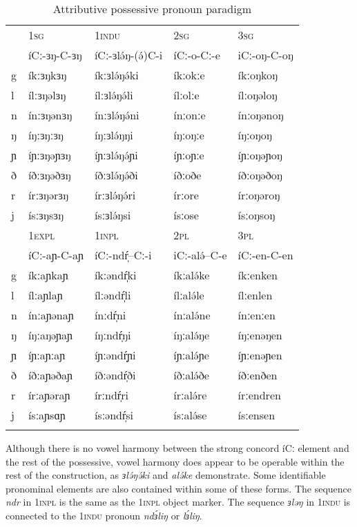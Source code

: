 \begin{table}
\begin{tabular}[t]{lllll}
\lsptoprule
	&	1\textsc{sg}			&	1\textsc{indu}		&	2\textsc{sg}			&	3\textsc{sg} \\
	& 	íCː-ɜŋ-C-ɜŋ	&	íCː-ɜlə́ŋ-(ə́)C-i & íCː-o-Cː-e 	&	iCː-oŋ-C-oŋ  \\
\midrule
	g&	íkːɜŋkɜŋ 	&	íkːɜlə́ŋə́ki	&	íkːokːe	&	íkːoŋkoŋ\\
	l&	ílːɜŋəlɜŋ 	&	ílːɜlə́ŋə́li	&	ílːolːe	&	ílːoŋəloŋ\\
	n&	ínːɜŋənɜŋ 	&	ínːɜlə́ŋə́ni	&	ínːonːe	&	ínːoŋənoŋ\\
	ŋ&	íŋːɜŋːɜŋ 	&	íŋːɜlə́ŋŋi	&	íŋːoŋːe	&	íŋːoŋoŋ	\\
	ɲ&	íɲːɜŋəɲɜŋ	&	íɲːɜlə́ŋə́ɲi  	&	íɲːoɲːe	&	íɲːoŋəɲoŋ	\\
	ð&	íðːɜŋəðɜŋ 	&	íðːɜlə́ŋə́ði 	&	íðːoðe	&	íðːoŋəðoŋ	\\
	r&	írːɜŋərɜŋ 	&	írːɜlə́ŋə́ri 	&	írːore	&	írːoŋəroŋ	\\
	j&	ísːɜŋsɜŋ 	&	ísːɜlə́ŋsi	&	ísːose	&	ísːoŋsoŋ\\
\midrule
&		1\textsc{expl}		&1\textsc{inpl}&		\textsc{2pl}&		\textsc{3pl} \\
&	íCː-aɲ-C-aɲ	&íCː-ndŕ̩--Cː-i&	iCː-alə́--C-e&	íCː-en-C-en \\
\midrule
	g&	íkːaɲkaɲ &	íkːəndŕ̩ki	&íkːalə́ke	&íkːenken\\
	l&	ílːaɲlaɲ & 	ílːəndŕ̩li  	&ílːalə́le	&	ílːenlen\\
n&	ínːaɲənaɲ &	ínːdŕ̩ni		&ínːalə́ne	&ínːenːen\\
	ŋ&	íŋːaŋəɲaɲ 	&íŋːndŕ̩ŋi	&íŋːalə́ŋe&	íŋːenəŋen\\
	ɲ&	íɲːaɲːaɲ 	&íɲːəndŕ̩ɲi	&íɲːalə́ɲe&	íɲːenəɲen\\
	ð&	íðːaɲəðaɲ &	íðːəndŕ̩ði	&íðːalə́ðe	&íðːenðen\\
	r&	írːaɲəraɲ &	írːndŕ̩ri	&	írːalə́re&		írːendren\\
	j&	ísːaɲsɑɲ& 	ísːəndŕ̩si	&ísːalə́se	&	ísːensen\\
\lspbottomrule
		\end{tabular}
		  \caption{Attributive possessive pronoun paradigm}
  \label{tab:ch7:4}
\end{table} %

Although there is no vowel harmony between the strong concord íCː element and the rest of the possessive, vowel harmony does appear to be operable within the rest of the construction, as \textit{ɜlə́ŋə́ki} and \textit{alə́ke} demonstrate. Some identifiable pronominal elements are also contained within some of these forms. The sequence \textit{ndr} in 1\textsc{inpl} is the same as the 1\textsc{inpl} object marker. The sequence \textit{ɜləŋ} in 1\textsc{indu} is connected to the 1\textsc{indu} pronoun \textit{ndɜ́liŋ} or \textit{lɜ́liŋ}.

